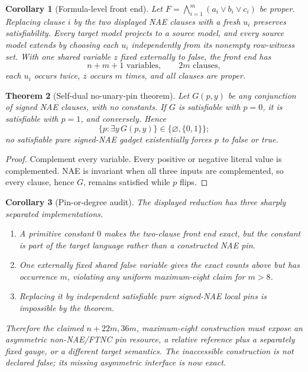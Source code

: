\documentclass[11pt]{article}
\newtheorem{theorem}{Theorem}
\newtheorem{corollary}[theorem]{Corollary}
\begin{document}
\begin{corollary}[Formula-level front end]
Let $F=\bigwedge_{i=1}^m(a_i\vee b_i\vee c_i)$ be proper.  Replacing clause
$i$ by the two displayed NAE clauses with a fresh $u_i$ preserves
satisfiability.  Every target model projects to a source model, and every
source model extends by choosing each $u_i$ independently from its nonempty
row-witness set.  With one shared variable $z$ fixed externally to false, the
front end has
\[
n+m+1\text{ variables},\qquad 2m\text{ clauses},
\]
each $u_i$ occurs twice, $z$ occurs $m$ times, and all clauses are proper.
\end{corollary}

\begin{theorem}[Self-dual no-unary-pin theorem]
Let $G(p,y)$ be any conjunction of signed NAE clauses, with no constants.
If $G$ is satisfiable with $p=0$, it is satisfiable with $p=1$, and conversely.
Hence
\[
\{p:\exists y\,G(p,y)\}\in\{\varnothing,\{0,1\}\};
\]
no satisfiable pure signed-NAE gadget existentially forces $p$ to false or true.
\end{theorem}
\begin{proof}
Complement every variable.  Every positive or negative literal value is
complemented.  NAE is invariant when all three inputs are complemented, so
every clause, hence $G$, remains satisfied while $p$ flips.
\end{proof}

\begin{corollary}[Pin-or-degree audit]
The displayed reduction has three sharply separated implementations.
\begin{enumerate}
\item A primitive constant $0$ makes the two-clause front end exact, but the
constant is part of the target language rather than a constructed NAE pin.
\item One externally fixed shared false variable gives the exact counts above
but has occurrence $m$, violating any uniform maximum-eight claim for $m>8$.
\item Replacing it by independent satisfiable pure signed-NAE local pins is
impossible by the theorem.
\end{enumerate}
Therefore the claimed $n+22m,36m$, maximum-eight construction must expose an
asymmetric non-NAE/FTNC pin resource, a relative reference plus a separately
fixed gauge, or a different target semantics.  The inaccessible construction
is not declared false; its missing asymmetric interface is now exact.
\end{corollary}
\end{document}
